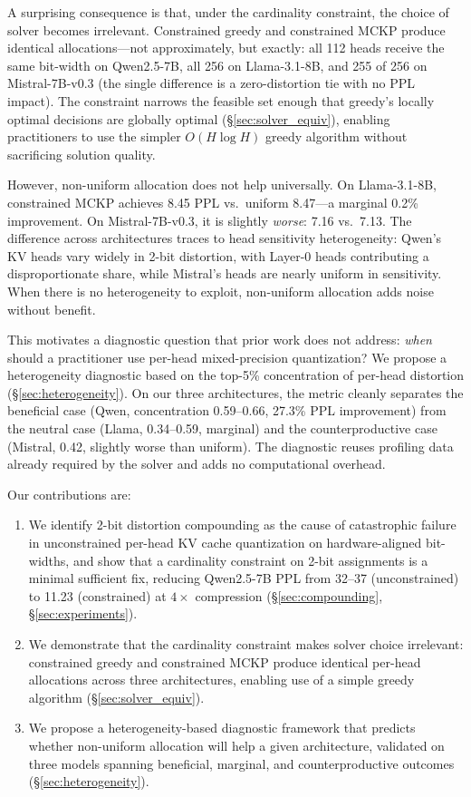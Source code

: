 A surprising consequence is that, under the cardinality constraint, the choice of solver becomes irrelevant.
Constrained greedy and constrained MCKP produce identical allocations---not approximately, but exactly: all 112 heads receive the same bit-width on Qwen2.5-7B, all 256 on Llama-3.1-8B, and 255 of 256 on Mistral-7B-v0.3 (the single difference is a zero-distortion tie with no PPL impact).
The constraint narrows the feasible set enough that greedy's locally optimal decisions are globally optimal (\S\ref{sec:solver_equiv}), enabling practitioners to use the simpler $O(H \log H)$ greedy algorithm without sacrificing solution quality.

However, non-uniform allocation does not help universally.
On Llama-3.1-8B, constrained MCKP achieves 8.45 PPL vs.\ uniform 8.47---a marginal 0.2\% improvement.
On Mistral-7B-v0.3, it is slightly \emph{worse}: 7.16 vs.\ 7.13.
The difference across architectures traces to head sensitivity heterogeneity: Qwen's KV heads vary widely in 2-bit distortion, with Layer-0 heads contributing a disproportionate share, while Mistral's heads are nearly uniform in sensitivity.
When there is no heterogeneity to exploit, non-uniform allocation adds noise without benefit.

This motivates a diagnostic question that prior work does not address: \emph{when} should a practitioner use per-head mixed-precision quantization?
We propose a heterogeneity diagnostic based on the top-5\% concentration of per-head distortion (\S\ref{sec:heterogeneity}).
On our three architectures, the metric cleanly separates the beneficial case (Qwen, concentration 0.59--0.66, 27.3\% PPL improvement) from the neutral case (Llama, 0.34--0.59, marginal) and the counterproductive case (Mistral, 0.42, slightly worse than uniform).
The diagnostic reuses profiling data already required by the solver and adds no computational overhead.

Our contributions are:
\begin{enumerate}[nosep]
\item We identify 2-bit distortion compounding as the cause of catastrophic failure in unconstrained per-head KV cache quantization on hardware-aligned bit-widths, and show that a cardinality constraint on 2-bit assignments is a minimal sufficient fix, reducing Qwen2.5-7B PPL from 32--37 (unconstrained) to 11.23 (constrained) at $4\times$ compression (\S\ref{sec:compounding}, \S\ref{sec:experiments}).

\item We demonstrate that the cardinality constraint makes solver choice irrelevant: constrained greedy and constrained MCKP produce identical per-head allocations across three architectures, enabling use of a simple greedy algorithm (\S\ref{sec:solver_equiv}).

\item We propose a heterogeneity-based diagnostic framework that predicts whether non-uniform allocation will help a given architecture, validated on three models spanning beneficial, marginal, and counterproductive outcomes (\S\ref{sec:heterogeneity}).
\end{enumerate}

